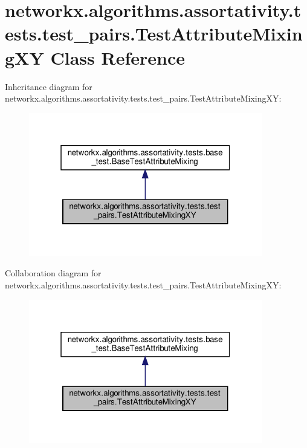 \hypertarget{classnetworkx_1_1algorithms_1_1assortativity_1_1tests_1_1test__pairs_1_1TestAttributeMixingXY}{}\section{networkx.\+algorithms.\+assortativity.\+tests.\+test\+\_\+pairs.\+Test\+Attribute\+Mixing\+XY Class Reference}
\label{classnetworkx_1_1algorithms_1_1assortativity_1_1tests_1_1test__pairs_1_1TestAttributeMixingXY}


Inheritance diagram for networkx.\+algorithms.\+assortativity.\+tests.\+test\+\_\+pairs.\+Test\+Attribute\+Mixing\+XY\+:
\nopagebreak
\begin{figure}[H]
\begin{center}
\leavevmode
\includegraphics[width=289pt]{classnetworkx_1_1algorithms_1_1assortativity_1_1tests_1_1test__pairs_1_1TestAttributeMixingXY__inherit__graph}
\end{center}
\end{figure}


Collaboration diagram for networkx.\+algorithms.\+assortativity.\+tests.\+test\+\_\+pairs.\+Test\+Attribute\+Mixing\+XY\+:
\nopagebreak
\begin{figure}[H]
\begin{center}
\leavevmode
\includegraphics[width=289pt]{classnetworkx_1_1algorithms_1_1assortativity_1_1tests_1_1test__pairs_1_1TestAttributeMixingXY__coll__graph}
\end{center}
\end{figure}
